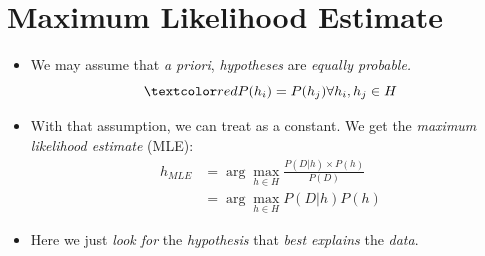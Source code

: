 \documentclass[
	number={3},
	title={Na\"iive Bayes Learning}
]{cs584notes}
\begin{document}
\section{Maximum Likelihood Estimate}\label{sec:maximum-likelihood-estimate}
\begin{itemize}
	\item We may assume that \emph{a priori}, \emph{hypotheses} are \emph{equally probable.}
	\[ \data{ P(h_{i}) = P(h_{j}) \forall h_{i}, h_{j} \in H } \]
	\item With that assumption, we can treat  as a constant. We get the \emph{maximum likelihood estimate} (MLE):
	\begin{equation}[eqred]
		\begin{aligned}
			h_{MLE} &= \arg\max_{h\in H} \frac{P(D|h)\times P(h)}{P(D)}\\
					&= \arg\max_{h\in H} P(D|h)P(h)
		\end{aligned}
		\label{eq:mle}
	\end{equation}
	\item Here we just \emph{look for} the \emph{hypothesis} that \emph{best explains} the \emph{data}.
\end{itemize}
\end{document}
